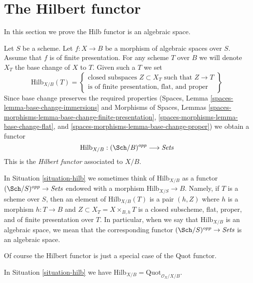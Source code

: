 \section{The Hilbert functor}
\label{section-hilb}

\noindent
In this section we prove the Hilb functor is an algebraic space.

\begin{situation}
\label{situation-hilb}
Let $S$ be a scheme. Let $f : X \to B$ be a morphism of
algebraic spaces over $S$. Assume that $f$ is of finite presentation.
For any scheme $T$ over $B$ we will denote $X_T$ the base change of
$X$ to $T$. Given such a $T$ we set
$$
\text{Hilb}_{X/B}(T) =
\left\{
\begin{matrix}
\text{closed subspaces }Z \subset X_T\text{ such that }Z \to T\\
\text{is of finite presentation, flat, and proper}
\end{matrix}
\right\}
$$
Since base change preserves the required properties
(Spaces, Lemma \ref{spaces-lemma-base-change-immersions} and
Morphisms of Spaces, Lemmas
\ref{spaces-morphisms-lemma-base-change-finite-presentation},
\ref{spaces-morphisms-lemma-base-change-flat}, and
\ref{spaces-morphisms-lemma-base-change-proper})
we obtain a functor
\begin{equation}
\label{equation-hilb}
\text{Hilb}_{X/B} : (\Sch/B)^{opp} \longrightarrow \textit{Sets}
\end{equation}
This is the {\it Hilbert functor} associated to $X/B$.
\end{situation}

\noindent
In Situation \ref{situation-hilb} we sometimes think of $\text{Hilb}_{X/B}$
as a functor $(\Sch/S)^{opp} \to \textit{Sets}$ endowed with a morphism
$\text{Hilb}_{X/S} \to B$. Namely, if $T$ is a scheme over $S$, then an element
of $\text{Hilb}_{X/B}(T)$ is a pair $(h, Z)$
where $h$ is a morphism $h : T \to B$
and $Z \subset X_T = X \times_{B, h} T$
is a closed subscheme, flat, proper, and of finite
presentation over $T$. In particular, when we say
that $\text{Hilb}_{X/B}$ is an algebraic space, we mean that the
corresponding functor $(\Sch/S)^{opp} \to \textit{Sets}$ is an algebraic space.

\medskip\noindent
Of course the Hilbert functor is just a special case of the
Quot functor.

\begin{lemma}
\label{lemma-hilb-is-quot}
In Situation \ref{situation-hilb} we have
$\text{Hilb}_{X/B} = \text{Quot}_{\mathcal{O}_X/X/B}$.
\end{lemma}

